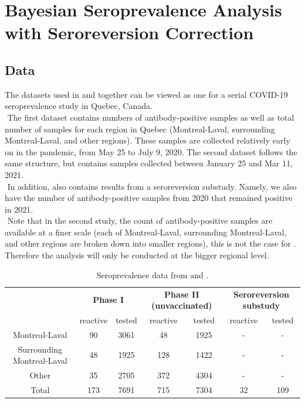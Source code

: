 \section{Bayesian Seroprevalence Analysis with Seroreversion Correction}

\subsection{Data}
The datasets used in \cite{lewin2021sars} and \cite{lewin2022seroprevalence} together can be viewed as one for a serial COVID-19 seroprevalence study in Quebec, Canada. \\
\newline $ $
The first dataset contains numbers of antibody-positive samples as well as total number of samples for each region in Quebec (Montreal-Laval, surrounding Montreal-Laval, and other regions). These samples are collected relatively early on in the pandemic, from May 25 to July 9, 2020. The second dataset follows the same structure, but contains samples collected between January 25 and Mar 11, 2021. \\
\newline $ $
In addition, \cite{lewin2022seroprevalence} also contains results from a seroreversion substudy. Namely, we also have the number of antibody-positive samples from 2020 that remained positive in 2021. \\
\newline $ $
Note that in the second study, the count of antibody-positive samples are available at a finer scale (each of Montreal-Laval, surrounding Montreal-Laval, and other regions are broken down into smaller regions), this is not the case for \cite{lewin2021sars}. Therefore the analysis will only be conducted at the bigger regional level.

\begin{table}[]
\centering
\label{tab:dat}
\begin{tabular}{c|cc|cc|cc}
                           & \multicolumn{2}{c}{\textbf{Phase I}} & \multicolumn{2}{c}{\textbf{Phase II (unvaccinated)}} & \multicolumn{2}{c}{\textbf{Seroreversion substudy}}\\
                           & reactive      & tested      & reactive              & tested      & reactive              & tested        \\
                           \hline
Montreal-Laval             & 90            & 3061        & 48                    & 1925      & - & -          \\
Surrounding Montreal-Laval & 48            & 1925        & 128                   & 1422   & - & -             \\
Other                      & 35            & 2705        & 372                   & 4304          & - & -      \\
\hline
Total                      & 173           & 7691        & 715                   & 7304          &    32 & 109  
\end{tabular}
\caption{Seroprevalence data from \cite{lewin2021sars} and \cite{lewin2022seroprevalence}.}
\end{table}

